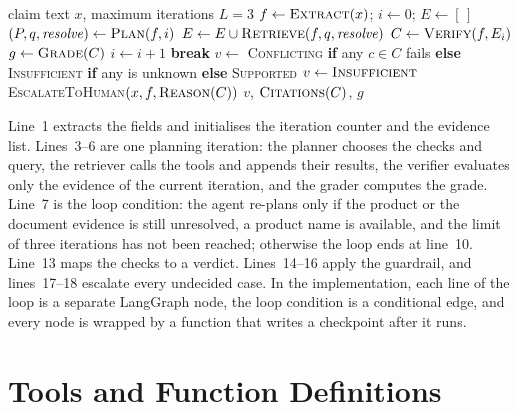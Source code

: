 \begin{algorithm}[H]
\caption{LoomTrace agent loop}
\label{alg:loop}
\begin{algorithmic}[1]
\Require claim text $x$, maximum iterations $L = 3$
\State $f \gets \textsc{Extract}(x)$; \quad $i \gets 0$; \quad $E \gets [\,]$
\Loop
  \State $(P, q, \mathit{resolve}) \gets \textsc{Plan}(f, i)$ 
  \State $E \gets E \cup \textsc{Retrieve}(f, q, \mathit{resolve})$ 
  \State $C \gets \textsc{Verify}(f, E_i)$ 
  \State $g \gets \textsc{Grade}(C)$
    \State $i \gets i + 1$ 
  \Else
    \State \textbf{break}
  \EndIf
\EndLoop
\State $v \gets$ \textsc{Conflicting} \textbf{if} any $c \in C$ fails \textbf{else} \textsc{Insufficient} \textbf{if} any is unknown \textbf{else} \textsc{Supported}
  \State $v \gets \textsc{Insufficient}$ 
\EndIf
{} \State \textsc{EscalateToHuman}$(x, f, \textsc{Reason}(C))$ \EndIf
\State \Return $v$, $\textsc{Citations}(C)$, $g$
\end{algorithmic}
\end{algorithm}

Line~1 extracts the fields and initialises the iteration counter and the evidence list. Lines~3--6 are
one planning iteration: the planner chooses the checks and query, the retriever calls the tools and
appends their results, the verifier evaluates only the evidence of the current iteration, and the
grader computes the grade. Line~7 is the loop condition: the agent re-plans only if the product or the
document evidence is still unresolved, a product name is available, and the limit of three iterations
has not been reached; otherwise the loop ends at line~10. Line~13 maps the checks to a verdict.
Lines~14--16 apply the guardrail, and lines~17--18 escalate every undecided case. In the
implementation, each line of the loop is a separate LangGraph node, the loop condition is a conditional
edge, and every node is wrapped by a function that writes a checkpoint after it runs.

\section{Tools and Function Definitions}

